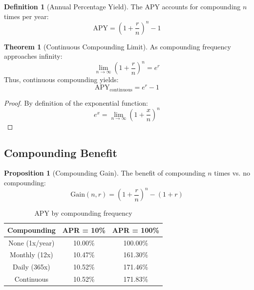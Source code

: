 \documentclass[11pt,a4paper]{article}
\theoremstyle{definition}
\newtheorem{definition}{Definition}
\newtheorem{theorem}{Theorem}
\newtheorem{proposition}{Proposition}
\begin{document}
\begin{definition}[Annual Percentage Yield]
The APY accounts for compounding $n$ times per year:
\begin{equation}
\text{APY} = \left(1 + \frac{r}{n}\right)^n - 1
\end{equation}
\end{definition}

\begin{theorem}[Continuous Compounding Limit]
As compounding frequency approaches infinity:
\begin{equation}
\lim_{n \to \infty} \left(1 + \frac{r}{n}\right)^n = e^r
\end{equation}
Thus, continuous compounding yields:
\begin{equation}
\text{APY}_{\text{continuous}} = e^r - 1
\end{equation}
\end{theorem}

\begin{proof}
By definition of the exponential function:
\begin{equation}
e^x = \lim_{n \to \infty} \left(1 + \frac{x}{n}\right)^n
\end{equation}
\end{proof}

\subsection{Compounding Benefit}

\begin{proposition}[Compounding Gain]
The benefit of compounding $n$ times vs. no compounding:
\begin{equation}
\text{Gain}(n, r) = \left(1 + \frac{r}{n}\right)^n - (1 + r)
\end{equation}
\end{proposition}

\begin{table}[h]
\centering
\begin{tabular}{|c|c|c|}
\hline
Compounding & APR = 10\% & APR = 100\% \\
\hline
None (1x/year) & 10.00\% & 100.00\% \\
Monthly (12x) & 10.47\% & 161.30\% \\
Daily (365x) & 10.52\% & 171.46\% \\
Continuous & 10.52\% & 171.83\% \\
\hline
\end{tabular}
\caption{APY by compounding frequency}
\end{table}
\end{document}
